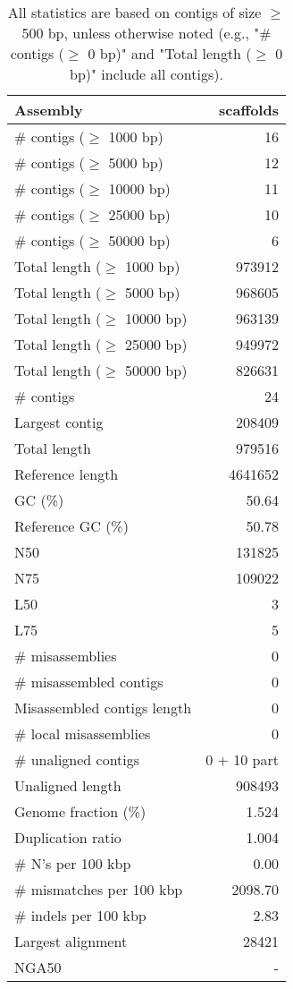 \documentclass[12pt,a4paper]{article}
\begin{document}
\begin{table}[ht]
\begin{center}
\caption{All statistics are based on contigs of size $\geq$ 500 bp, unless otherwise noted (e.g., "\# contigs ($\geq$ 0 bp)" and "Total length ($\geq$ 0 bp)" include all contigs).}
\begin{tabular}{|l*{1}{|r}|}
\hline
Assembly & scaffolds \\ \hline
\# contigs ($\geq$ 1000 bp) & 16 \\ \hline
\# contigs ($\geq$ 5000 bp) & 12 \\ \hline
\# contigs ($\geq$ 10000 bp) & 11 \\ \hline
\# contigs ($\geq$ 25000 bp) & 10 \\ \hline
\# contigs ($\geq$ 50000 bp) & 6 \\ \hline
Total length ($\geq$ 1000 bp) & 973912 \\ \hline
Total length ($\geq$ 5000 bp) & 968605 \\ \hline
Total length ($\geq$ 10000 bp) & 963139 \\ \hline
Total length ($\geq$ 25000 bp) & 949972 \\ \hline
Total length ($\geq$ 50000 bp) & 826631 \\ \hline
\# contigs & 24 \\ \hline
Largest contig & 208409 \\ \hline
Total length & 979516 \\ \hline
Reference length & 4641652 \\ \hline
GC (\%) & 50.64 \\ \hline
Reference GC (\%) & 50.78 \\ \hline
N50 & 131825 \\ \hline
N75 & 109022 \\ \hline
L50 & 3 \\ \hline
L75 & 5 \\ \hline
\# misassemblies & 0 \\ \hline
\# misassembled contigs & 0 \\ \hline
Misassembled contigs length & 0 \\ \hline
\# local misassemblies & 0 \\ \hline
\# unaligned contigs & 0 + 10 part \\ \hline
Unaligned length & 908493 \\ \hline
Genome fraction (\%) & 1.524 \\ \hline
Duplication ratio & 1.004 \\ \hline
\# N's per 100 kbp & 0.00 \\ \hline
\# mismatches per 100 kbp & 2098.70 \\ \hline
\# indels per 100 kbp & 2.83 \\ \hline
Largest alignment & 28421 \\ \hline
NGA50 & - \\ \hline
\end{tabular}
\end{center}
\end{table}
\end{document}
